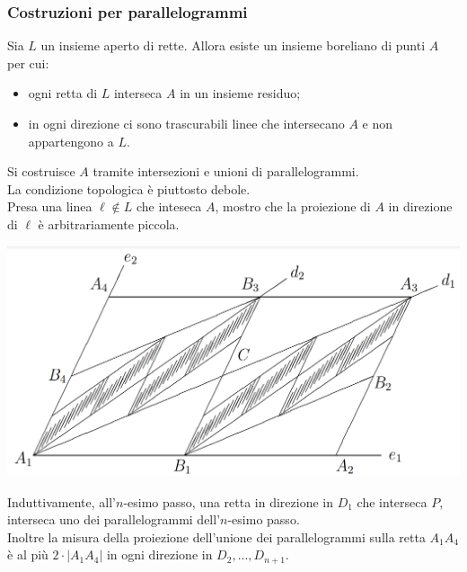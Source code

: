 \documentclass[11pt]{beamer} %
\newcommand{\<}{\langle}
\renewcommand{\>}{\rangle}
\theoremstyle{theorem}
\theoremstyle{theorem}
\theoremstyle{theorem}
\theoremstyle{theorem}
\theoremstyle{theorem}
\begin{document}
\begin{frame}
	\frametitle{Costruzioni per parallelogrammi}
	\begin{lemma}
		Sia $L$ un insieme aperto di rette. Allora esiste un insieme boreliano di punti $A$ per cui:\\
		\begin{itemize}
			\item ogni retta di $L$ interseca $A$ in un insieme residuo;\\
			\item in ogni direzione ci sono trascurabili linee che intersecano $A$ e non appartengono a $L$.\\
		\end{itemize}
	\end{lemma}
	
	\pause
	Si costruisce $A$ tramite intersezioni e unioni di parallelogrammi.\\ \pause
	La condizione topologica è piuttosto debole.\\ \pause
	Presa una linea $\ell \not \in L$ che inteseca $A$, mostro che la proiezione di $A$ in direzione di $\ell$ è arbitrariamente piccola.
	
	
\end{frame}	


\begin{frame}[fragile]
	
	\begin{center}
	\includegraphics[width=0.5\columnwidth]{passi123.png}
	\end{center}

	Induttivamente, all'$n$-esimo passo, una retta in direzione in $D_1$ che interseca $P$, interseca uno dei parallelogrammi dell'$n$-esimo passo.\\
	Inoltre la misura della proiezione dell'unione dei parallelogrammi 
	sulla retta $A_{1} A_{4}$ è al più $2 \cdot\left|A_{1} A_{4}\right|$ in ogni direzione in $D_2,...,D_{n+1}$.\\

\end{frame}
\end{document}
